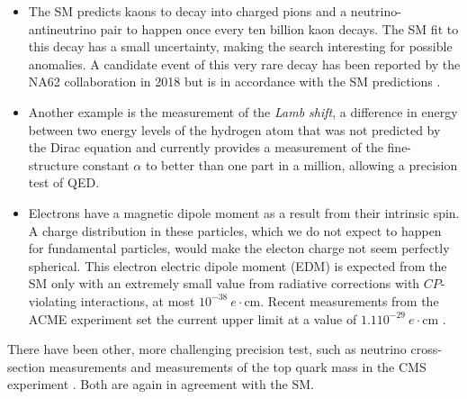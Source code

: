\vspace{2mm}
\begin{itemize}
\item The SM predicts kaons to decay into charged pions and a neutrino-antineutrino pair to happen once every ten billion kaon decays. The SM fit to this decay has a small uncertainty, making the search interesting for possible anomalies. A candidate event of this very rare decay has been reported by the NA62 collaboration in 2018 but is in accordance with the SM predictions \cite{na62}.

\item Another example is the measurement of the \textit{Lamb shift}, a difference in energy between two energy levels of the hydrogen atom that was not predicted by the Dirac equation and currently provides a measurement of the fine-structure constant $\alpha$ to better than one part in a million, allowing a precision test of QED.

\item Electrons have a magnetic dipole moment as a result from their intrinsic spin. A charge distribution in these particles, which we do not expect to happen for fundamental particles, would make the electon charge not seem perfectly spherical. This electron electric dipole moment (EDM) is expected from the SM only with an extremely small value from radiative corrections with $CP$-violating interactions, at most $10^{-38}\ e \cdot \textrm{cm}$. Recent measurements from the ACME experiment set the current upper limit at a value of  $1.1 10^{-29}\ e \cdot \textrm{cm}$ \cite{Cesarotti:2018huy}.
\end{itemize}
\vspace{2mm}

\noindent There have been other, more challenging precision test, such as neutrino cross-section measurements \cite{Aartsen:2017kpd} and measurements of the top quark mass in the CMS experiment \cite{Castro:2017yxe}. Both are again in agreement with the SM.


